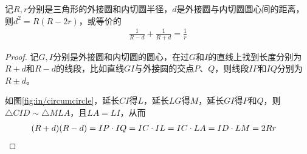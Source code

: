 \begin{theorem}[Euler定理]
  记$R,r$分别是三角形的外接圆和内切圆半径，$d$是外接圆与内切圆圆心间的距离，则$d^2=R(R-2r)$，或等价的
  \begin{align*}
    \frac1{R-d}+\frac1{R+d}=\frac1r
  \end{align*}
\end{theorem}
\begin{proof}
  记$G,I$分别是外接圆和内切圆的圆心，在过$G$和$I$的直线上找到长度分别为$R+d$和$R-d$的线段，比如直线$GI$与外接圆的交点$P$、$Q$，则线段$IP$和$IQ$分别为$R\pm d$。

  如图\ref{fig:in/circumcircle}，延长$CI$得$L$，延长$LG$得$M$，延长$GI$得$P$和$Q$，则$\triangle CID\sim\triangle MLA$，且$LA=LI$，从而
  \begin{align*}
    (R+d)(R-d)&=IP\cdot IQ=IC\cdot IL=IC\cdot LA=ID\cdot LM=2Rr&\qedhere
  \end{align*}
\end{proof}

